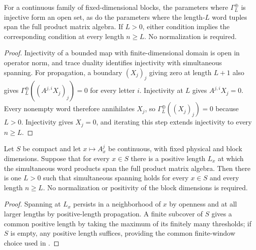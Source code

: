 \begin{lemma}
    \label{thm:block_ground_space_map_injective_open_propagation}
    \leanok
    For a continuous family of fixed-dimensional blocks, the parameters
    where $\Gamma_L^{\oplus}$ is injective form an open set, as do the
    parameters where the length-$L$ word tuples span the full product
    matrix algebra. If $L>0$, either condition implies the corresponding
    condition at every length $n\geq L$. No normalization is required.
\end{lemma}
\begin{proof}
    \leanok
    Injectivity of a bounded map with finite-dimensional domain is open
    in operator norm, and trace duality identifies injectivity with
    simultaneous spanning. For propagation, a boundary $(X_j)_j$ giving
    zero at length $L+1$ also gives
    $\Gamma_L^{\oplus}((A^{j,i}X_j)_j)=0$ for every letter $i$.
    Injectivity at $L$ gives $A^{j,i}X_j=0$. Every nonempty word therefore
    annihilates $X_j$, so $\Gamma_L^{\oplus}((X_j)_j)=0$ because $L>0$.
    Injectivity gives $X_j=0$, and iterating this step extends injectivity to
    every $n\geq L$.
\end{proof}

\begin{lemma}
    \label{thm:compact_block_word_span}
    \leanok

    Let $S$ be compact and let $x\mapsto A_x^j$ be continuous, with fixed
    physical and block dimensions. Suppose that for every $x\in S$ there
    is a positive length $L_x$ at which the simultaneous word products
    span the full product matrix algebra. Then there is one $L>0$ such
    that simultaneous spanning holds for every $x\in S$ and every
    length $n\geq L$. No normalization or positivity of the block
    dimensions is required.
\end{lemma}
\begin{proof}
    \leanok
    Spanning at $L_x$ persists in a neighborhood of $x$ by openness and
    at all larger lengths by positive-length propagation. A finite
    subcover of $S$ gives a common positive length by taking the maximum
    of its finitely many thresholds; if $S$ is empty, any positive length
    suffices, providing the common finite-window choice used in
    \cite[Appendix~A, lines~2499--2503 and~2575--2578]{Schuch2011Phases}.
\end{proof}

